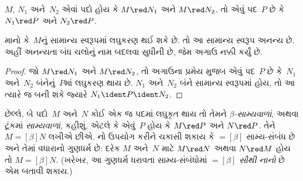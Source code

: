 \documentclass[../../../include/open-logic-section]{subfiles}
\begin{document}

\begin{thm}
$M$, $N_1$ અને~$N_2$ એવાં પદો હોય કે $M \red N_1$ અને $M \red
N_2$. તો એવું પદ~$P$ છે કે $N_1 \red P$ અને $N_2 \red P$.
\end{thm}

\begin{cor}
માનો કે~$M$નું સામાન્ય સ્વરૂપમાં લઘુકરણ થઈ શકે છે. તો આ
સામાન્ય સ્વરૂપ અનન્ય છે.
અહીં અનન્યતા બંધ ચલોનું નામ બદલવા સુધીની છે, જેમ અગાઉ નક્કી કર્યું છે.
\end{cor}

\begin{proof}
જો $M \red N_1$ અને $M \red N_2$, તો અગાઉના પ્રમેય મુજબ એવું
પદ~$P$ છે કે~$N_1$ અને~$N_2$ બંનેનું~$P$માં લઘુકરણ થાય છે.
$N_1$ અને~$N_2$ બંને સામાન્ય સ્વરૂપમાં હોય, તો આ ત્યારે જ બની
શકે જ્યારે $N_1 \ident P \ident N_2$.
\end{proof}

છેલ્લે, બે પદો~$M$ અને~$N$ કોઈ એક જ પદમાં લઘુકૃત થાય તો તેમને
\emph{$\beta$-સામ્યવાળાં}, અથવા ટૂંકમાં \emph{સામ્યવાળાં},
કહીશું. એટલે કે એવું~$P$ હોય કે $M \red P$ અને $N \red P$.
તેને $M \equal[\beta] N$ લખીએ છીએ. 
નો ઉપયોગ કરીને ચકાસી શકાય કે
$\equal[\beta]$ સામ્ય-સંબંધ છે અને તેમાં વધારાનો ગુણધર્મ છે:
દરેક $M$ અને~$N$ માટે $M \red N$ અથવા $N \red M$ હોય તો
$M \equal[\beta] N$. (ખરેખર, આ ગુણધર્મ ધરાવતા સામ્ય-સંબંધોમાં
$\equal[\beta]$ \emph{સૌથી નાનો} છે એમ બતાવી શકાય.)
\end{document}

